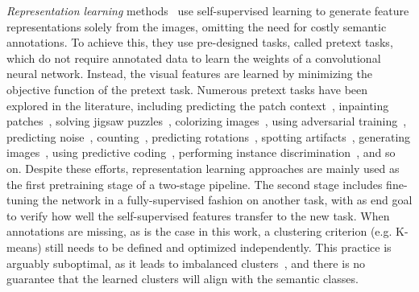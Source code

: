 \documentclass[runningheads]{llncs}
\begin{document}
\textit{Representation learning} methods~\cite{doersch2015unsupervised,ContextEncoders,zhang2016colorful,noroozi2016unsupervised,RotNet} use self-supervised learning to generate feature representations solely from the images, omitting the need for costly semantic annotations. To achieve this, they use pre-designed tasks, called pretext tasks, which do not require annotated data to learn the weights of a convolutional neural network. Instead, the visual features are learned by minimizing the objective function of the pretext task. Numerous pretext tasks have been explored in the literature, including predicting the patch context~\cite{doersch2015unsupervised,nathan2018improvements}, inpainting patches~\cite{ContextEncoders}, solving jigsaw puzzles~\cite{noroozi2016unsupervised,noroozi2018boosting}, colorizing images~\cite{zhang2016colorful,larsson2017colorization}, using adversarial training~\cite{donahue2017adversarial,donahue2019large}, predicting noise~\cite{bojanowski2017unsupervised}, counting~\cite{noroozi2017representation}, predicting rotations~\cite{RotNet}, spotting artifacts~\cite{jenni2018self}, generating images~\cite{ren2018cross}, using predictive coding~\cite{oord2018representation,henaff2019data}, performing instance discrimination~\cite{wu2018unsupervised,he2019momentum,chen2020simple,CMC,PIRL}, and so on. Despite these efforts, representation learning approaches are mainly used as the first pretraining stage of a two-stage pipeline. The second stage includes fine-tuning the network in a fully-supervised fashion on another task, with as end goal to verify how well the self-supervised features transfer to the new task. When annotations are missing, as is the case in this work, a clustering criterion (e.g. K-means) still needs to be defined and optimized independently. This practice is arguably suboptimal, as it leads to imbalanced clusters~\cite{DeepCluster}, and there is no guarantee that the learned clusters will align with the semantic classes.
\end{document}
